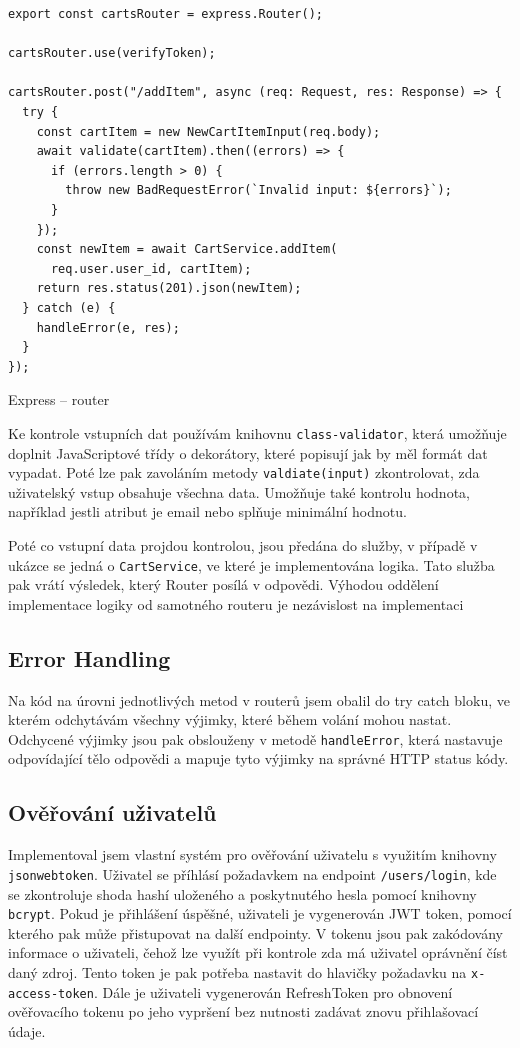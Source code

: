 \documentclass[thesis=M,czech]{FITthesis}[2019/12/23]
\begin{document}
\begin{listing}[H]
\begin{verbatim}
export const cartsRouter = express.Router();

cartsRouter.use(verifyToken);

cartsRouter.post("/addItem", async (req: Request, res: Response) => {
  try {
    const cartItem = new NewCartItemInput(req.body);
    await validate(cartItem).then((errors) => {
      if (errors.length > 0) {
        throw new BadRequestError(`Invalid input: ${errors}`);
      }
    });
    const newItem = await CartService.addItem(
      req.user.user_id, cartItem);
    return res.status(201).json(newItem);
  } catch (e) {
    handleError(e, res);
  }
});
\end{verbatim}
\caption{Express -- router}
\label{lst:express_router}
\end{listing}

Ke kontrole vstupních dat používám knihovnu \texttt{class-validator}, která umožňuje doplnit JavaScriptové třídy o dekorátory, které popisují jak by měl formát dat vypadat. Poté lze pak zavoláním metody \texttt{valdiate(input)} zkontrolovat, zda uživatelský vstup obsahuje všechna data. Umožňuje také kontrolu hodnota, například jestli atribut je email nebo splňuje minimální hodnotu.

Poté co vstupní data projdou kontrolou, jsou předána do služby, v případě v ukázce se jedná o \texttt{CartService}, ve které je implementována logika. Tato služba pak vrátí výsledek, který Router posílá v odpovědi. Výhodou oddělení implementace logiky od samotného routeru je nezávislost na implementaci

\subsection{Error Handling}
Na kód na úrovni jednotlivých metod v routerů jsem obalil do try catch bloku, ve kterém odchytávám všechny výjimky, které během volání mohou nastat. Odchycené výjimky jsou pak obslouženy v metodě \texttt{handleError}, která nastavuje odpovídající tělo odpovědi a mapuje tyto výjimky na správné HTTP status kódy.

\subsection{Ověřování uživatelů}
Implementoval jsem vlastní systém pro ověřování uživatelu s využitím knihovny \texttt{jsonwebtoken}. Uživatel se příhlásí požadavkem na endpoint \texttt{/users/login}, kde se zkontroluje shoda hashí uloženého a poskytnutého hesla pomocí knihovny \texttt{bcrypt}. Pokud je přihlášení úspěšné, uživateli je vygenerován JWT token, pomocí kterého pak může přistupovat na další endpointy. V tokenu jsou pak zakódovány informace o uživateli, čehož lze využít při kontrole zda má uživatel oprávnění číst daný zdroj. Tento token je pak potřeba nastavit do hlavičky požadavku na \texttt{x-access-token}. Dále je uživateli vygenerován RefreshToken pro obnovení ověřovacího tokenu po jeho vypršení bez nutnosti zadávat znovu přihlašovací údaje.
\end{document}
